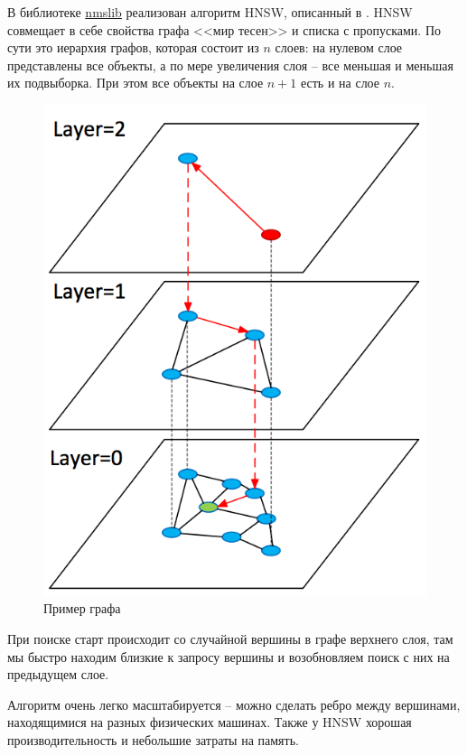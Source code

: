 В библиотеке \href{https://github.com/nmslib/nmslib}{nmslib} реализован алгоритм HNSW,
описанный в \cite{hnsw}. HNSW совмещает в себе свойства графа <<мир тесен>> и списка с пропусками.
По сути это иерархия графов, которая состоит из $n$ слоев: на нулевом слое представлены
все объекты, а по мере увеличения слоя -- все меньшая и меньшая их подвыборка.
При этом все объекты на слое $n+1$ есть и на слое $n$.
\begin{figure}[H]
    \begin{center}
        \includegraphics[scale=0.4]{inc/img/hnsw.png}
        \caption{Пример графа}
    \end{center}
\end{figure}

При поиске старт происходит со случайной вершины в графе верхнего слоя, там мы быстро
находим близкие к запросу вершины и возобновляем поиск с них на предыдущем слое.


Алгоритм очень легко масштабируется -- можно сделать ребро между вершинами, находящимися
на разных физических машинах. Также у HNSW хорошая производительность и небольшие затраты
на память.